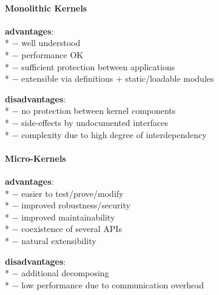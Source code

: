 \paragraph{Monolithic Kernels}
\begin{items}
  \item \textbf{advantages}: \\*
    $ - $ well understood \\*
    $ - $ performance OK \\*
    $ - $ sufficient protection between applications \\*
    $ - $ extensible via definitions + static/loadable modules
  \item \textbf{disadvantages}: \\*
    $ - $ no protection between kernel components \\*
    $ - $ side-effects by undocumented interfaces \\*
    $ - $ complexity due to high degree of interdependency
\end{items}

\paragraph{Micro-Kernels}
\begin{items}
  \item \textbf{advantages}: \\*
    $ - $ easier to test/prove/modify \\*
    $ - $ improved robustness/security \\*
    $ - $ improved maintainability \\*
    $ - $ coexistence of several APIs \\*
    $ - $ natural extensibility
  \item \textbf{disadvantages}: \\*
    $ - $ additional decomposing \\*
    $ - $ low performance due to communication overhead
\end{items}

